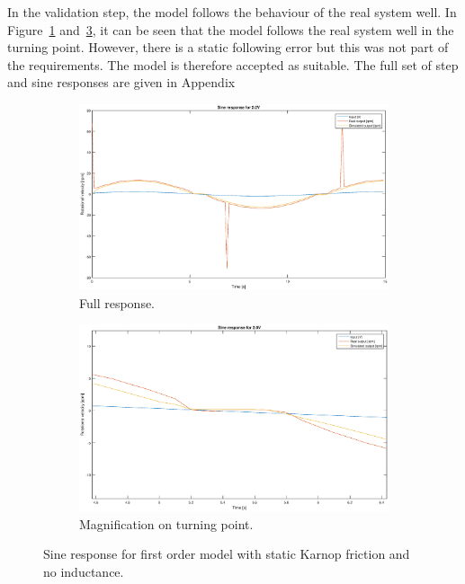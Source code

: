 In the validation step, the model follows the behaviour of the real system well.
In Figure~\ref{fig:1storder_f_sine2} and~\ref{fig:1storder_f_sine2z}, it can be
seen that the model follows the real system well in the turning point. However,
there is a static following error but this was not part of the requirements. The
model is therefore accepted as suitable. The full set of step and sine responses
are given in Appendix %
\begin{figure}[H]
    \centering
    \begin{subfigure}[H]{0.48\textwidth}
    \label{fig:1storder_f_sine2}
    \includegraphics[width=\textwidth]{./img/testrig_2Vsine_no_i_fric.eps}
    \caption{Full response.}
    \end{subfigure}
    \begin{subfigure}[H]{0.48\textwidth}
    \label{fig:1storder_f_sine2z}
    \includegraphics[width=\textwidth]{./img/testrig_2Vsine_no_i_fric_zoom.eps}
    \caption{Magnification on turning point.}
    \end{subfigure}
    \caption{Sine response for first order model with static Karnop friction and 
    no inductance.}
\end{figure}

